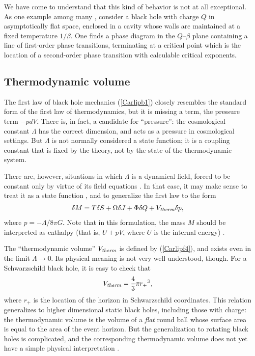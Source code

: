 \documentclass[11pt]{article}
\begin{document}
We have come to understand that this kind of behavior is not at all
exceptional.  As one example among many \cite{CarlipVaidya}, 
consider a black hole with charge $Q$ in asymptotically flat 
space, enclosed in a cavity whose walls are maintained at a fixed
temperature $1/\beta$.  One finds a phase diagram in the $Q$--$\beta$ 
plane containing a line of first-order phase transitions, terminating 
at a critical point which is the location of a second-order phase transition
with calculable critical exponents.

\subsection{Thermodynamic volume}

The first law of black hole mechanics (\ref{Carlipb1}) closely
resembles the standard form of the first law of thermodynamics,
but it is missing a term, the  pressure term $-pdV$.  There
is, in fact, a candidate for ``pressure'': the
cosmological constant $\Lambda$ has the correct dimension, and
acts as a pressure in cosmological settings.  But $\Lambda$ is not
 normally considered a state function; it is a coupling constant that
 is fixed by the theory, not by the state of the thermodynamic system.

There are, however, situations in which $\Lambda$ is a dynamical
field, forced to be constant only by virtue of its field equations
\cite{HennTeit1}.  In that case, it may make sense to treat it as
a state function \cite{Caldarelli}, and to generalize the first law 
to the form \cite{Sekiwa,KRT}
\begin{align}
\delta M = T\delta S + \Omega \delta J + \Phi \delta Q 
    + V_{\hbox{\scriptsize\it therm}}\delta p  ,
\label{Carlipf4}
\end{align}
where $p = - {\Lambda}/{8\pi G}$.  Note that in this formulation, 
the mass $M$ should be interpreted as enthalpy (that is, $U+pV$,
where $U$ is the internal energy) \cite{KRT}.

The ``thermodynamic volume'' $V_{\hbox{\scriptsize\it therm}}$ 
is defined by (\ref{Carlipf4}), and exists even in the limit 
$\Lambda\rightarrow0$.  Its physical meaning is not very well 
understood, though.  For a Schwarzschild black hole, it is easy 
to check that
\begin{align}
V_{\hbox{\scriptsize\it therm}} = \frac{4}{3}\pi r_+{}^3   ,
\label{Carlipf5}
\end{align}
where $r_+$ is the location of the horizon in Schwarzschild coordinates.
This relation generalizes to higher dimensional static black holes,
including those with charge: the thermodynamic volume is the volume
of a \emph{flat} round ball whose surface area is equal to the area of the 
event horizon.  But the generalization to rotating black holes is complicated, 
and the corresponding thermodynamic volume does not yet have a simple
physical interpretation \cite{Cvetic}.
\end{document}
